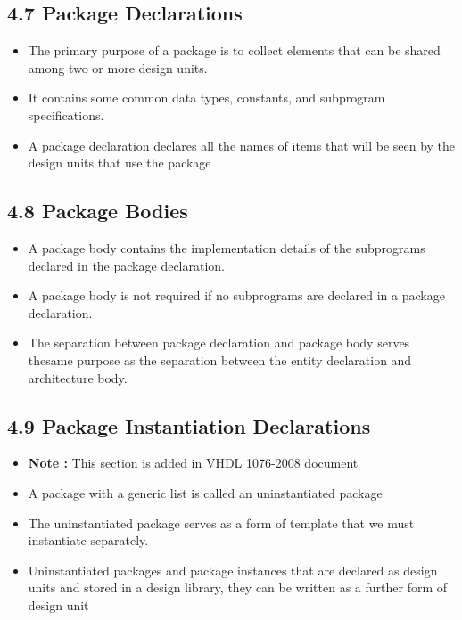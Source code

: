 \documentclass[a4paper,12pt]{article}
\begin{document}
	\subsection*{4.7 Package Declarations}
	\begin{itemize}
		\item The primary purpose of a package is to collect elements that can be shared among two or more design units.
		\item  It contains some common data types, constants, and subprogram specifications.
		\item A package declaration declares all the names of items that will be seen by the design units that use the package
	\end{itemize}
	
	\subsection*{4.8 Package Bodies}
	\begin{itemize}
		\item A package body contains the implementation details of the subprograms declared in the package declaration.
		\item A package body is not required if no subprograms are declared in a package declaration.
		\item The separation between package declaration and package body serves thesame purpose as the separation between the entity declaration and architecture body.
	\end{itemize}
	
	\subsection*{4.9 Package Instantiation Declarations}
	\begin{itemize}
		\item \textbf{Note :} This section is added in VHDL 1076-2008 document
		\item A package with a generic list is called an uninstantiated package
		\item The uninstantiated package serves as a form of template that we must instantiate separately.
		\item Uninstantiated packages and package instances that are declared as design units and stored in a design library, they  can be written as a further form of design unit
	\end{itemize}
	
\end{document}

